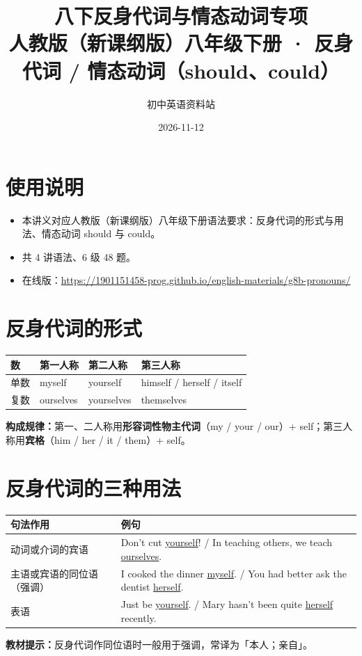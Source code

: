 \documentclass[11pt,a4paper]{ctexart}
\title{\textbf{八下反身代词与情态动词专项}\\[4pt]
\large 人教版（新课纲版）八年级下册 · 反身代词 / 情态动词（should、could）}
\author{初中英语资料站}
\date{2026-11-12}
\begin{document}
\maketitle

\section*{使用说明}
\begin{itemize}[leftmargin=1.4em]
\item 本讲义对应人教版（新课纲版）八年级下册语法要求：反身代词的形式与用法、情态动词 should 与 could。
\item 共 4 讲语法、6 级 48 题。
\item 在线版：\url{https://1901151458-prog.github.io/english-materials/g8b-pronouns/}
\end{itemize}

\section{反身代词的形式}
\begin{center}
\begin{tabular}{p{2.0cm}p{3.8cm}p{3.8cm}p{4.0cm}}
\hline
\textbf{数} & \textbf{第一人称} & \textbf{第二人称} & \textbf{第三人称}\\
\hline
单数 & myself & yourself & himself / herself / itself\\
复数 & ourselves & yourselves & themselves\\
\hline
\end{tabular}
\end{center}
\textbf{构成规律：}第一、二人称用\textbf{形容词性物主代词}（my / your / our）+ self；第三人称用\textbf{宾格}（him / her / it / them）+ self。

\section{反身代词的三种用法}
\begin{center}
\begin{tabular}{p{4.2cm}p{9.6cm}}
\hline
\textbf{句法作用} & \textbf{例句}\\
\hline
动词或介词的宾语 & Don't cut \underline{yourself}! / In teaching others, we teach \underline{ourselves}.\\
主语或宾语的同位语（强调） & I cooked the dinner \underline{myself}. / You had better ask the dentist \underline{herself}.\\
表语 & Just be \underline{yourself}. / Mary hasn't been quite \underline{herself} recently.\\
\hline
\end{tabular}
\end{center}
\textbf{教材提示：}反身代词作同位语时一般用于强调，常译为「本人；亲自」。
\end{document}
